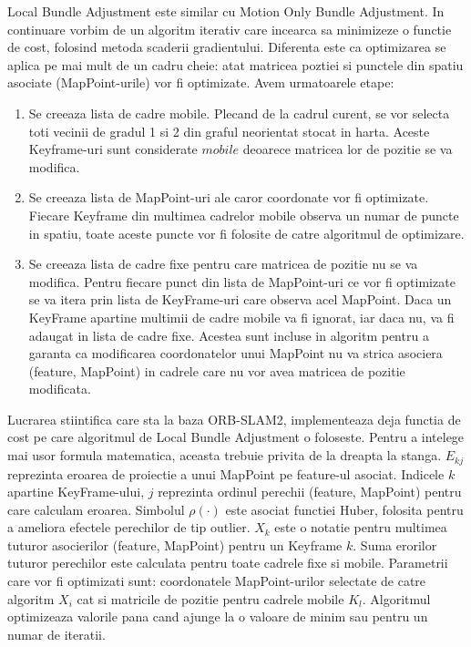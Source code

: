 \documentclass[12pt,a4paper]{report}
\begin{document}
Local Bundle Adjustment este similar cu Motion Only Bundle Adjustment. In continuare vorbim de un
algoritm iterativ care incearca sa minimizeze o functie de cost, folosind metoda scaderii 
gradientului. Diferenta este ca optimizarea se aplica pe mai mult de un cadru cheie: atat
matricea poztiei si punctele din spatiu asociate (MapPoint-urile) vor fi optimizate.
Avem urmatoarele etape:
\begin{enumerate}
    \item Se creeaza lista de cadre mobile. Plecand de la cadrul curent, se vor selecta
    toti vecinii de gradul 1 si 2 din graful neorientat stocat in harta. Aceste Keyframe-uri
    sunt considerate \(mobile\) deoarece matricea lor de pozitie se va modifica.  
    \item Se creeaza lista de MapPoint-uri ale caror coordonate vor fi optimizate. Fiecare
Keyframe din multimea cadrelor mobile observa un numar de puncte in spatiu, toate aceste
puncte vor fi folosite de catre algoritmul de optimizare.
    \item Se creeaza lista de cadre fixe pentru care matricea de pozitie nu se va 
modifica. Pentru fiecare punct din lista de MapPoint-uri ce vor fi optimizate se va itera 
prin lista de KeyFrame-uri care observa acel MapPoint. Daca un KeyFrame apartine multimii 
de cadre mobile va fi ignorat, iar daca nu, va fi adaugat in lista de
cadre fixe. Acestea sunt incluse in algoritm pentru a garanta ca modificarea coordonatelor
unui MapPoint nu va strica asociera (feature, MapPoint) in cadrele care nu vor avea matricea
de pozitie modificata. 
\end{enumerate}

Lucrarea stiintifica care sta la baza ORB-SLAM2, implementeaza deja functia de 
cost pe care algoritmul de Local Bundle Adjustment o foloseste. Pentru a intelege mai usor formula 
matematica, aceasta trebuie privita de la dreapta la stanga. \(E_{kj}\) reprezinta eroarea
de proiectie a unui MapPoint pe feature-ul asociat. Indicele \(k\) apartine KeyFrame-ului,
\(j\) reprezinta ordinul perechii (feature, MapPoint) pentru care calculam eroarea. Simbolul 
$ \rho(\cdot) $ este asociat functiei Huber, folosita pentru a ameliora efectele perechilor de tip 
outlier. \(X_k\) este o notatie pentru multimea tuturor asocierilor (feature, MapPoint) pentru un 
Keyframe \(k\). Suma erorilor tuturor perechilor este calculata pentru toate cadrele fixe si mobile.
Parametrii care vor fi optimizati sunt: coordonatele MapPoint-urilor selectate de catre
algoritm \(X_i\) cat si matricile de pozitie pentru cadrele mobile \( K_l \). Algoritmul 
optimizeaza valorile pana cand ajunge la o valoare de minim sau pentru un numar de iteratii. 
\end{document}
